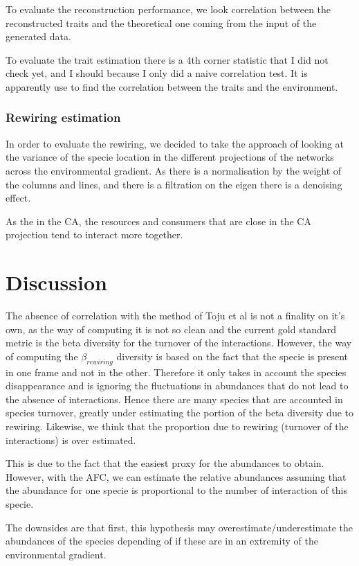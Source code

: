\documentclass{article}
\begin{document}
To evaluate the reconstruction performance, we look correlation between the reconstructed traits and the theoretical one coming from the input of the generated data.

To evaluate the trait estimation there is a 4th corner statistic that I did not check yet, and I should because I only did a naive correlation test. It is apparently use to find the correlation between the traits and the environment.

\subsubsection{Rewiring estimation}

In order to evaluate the rewiring, we decided to take the approach of looking at the variance of the specie location in the different projections of the networks across the environmental gradient. 
As there is a normalisation by the weight of the columns and lines, and there is a filtration on the eigen there is a denoising effect.

As the in the CA, the resources and consumers that are close in the CA projection tend to interact more together.

\section{Discussion}

The absence of correlation with the method of Toju et al is not a finality on it's own, as the way of computing it is not so clean and the current gold standard metric is the beta diversity for the turnover of the interactions. However, the way of computing the $\beta_{rewiring}$ diversity is based on the fact that the specie is present in one frame and not in the other. Therefore it only takes in account the species disappearance and is ignoring the fluctuations in abundances that do not lead to the absence of interactions. Hence there are many species that are accounted in species turnover, greatly under estimating the portion of the beta diversity due to rewiring. Likewise, we think that the proportion due to rewiring (turnover of the interactions) is over estimated.

This is due to the fact that the easiest proxy for the abundances to obtain. However, with the AFC, we can estimate the relative abundances assuming that the abundance for one specie is proportional to the number of interaction of this specie.

The downsides are that first, this hypothesis may overestimate/underestimate the abundances of the species depending of if these are in an extremity of the environmental gradient.
\end{document}
